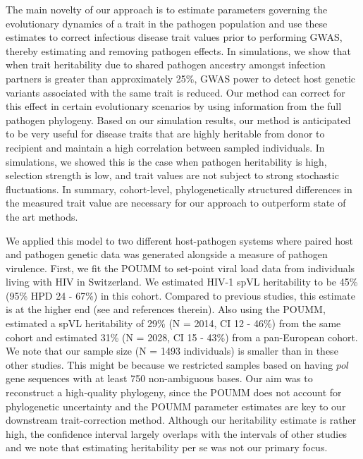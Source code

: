 \documentclass[11pt]{article}
\begin{document}
\begin{linenumbers}
The main novelty of our approach is to estimate parameters governing the evolutionary dynamics of a trait in the pathogen population and use these estimates to correct infectious disease trait values prior to performing GWAS, thereby estimating and removing pathogen effects. In simulations, we show that when trait heritability due to shared pathogen ancestry amongst infection partners is greater than approximately 25\%, GWAS power to detect host genetic variants associated with the same trait is reduced. Our method can correct for this effect in certain evolutionary scenarios by using information from the full pathogen phylogeny. Based on our simulation results, our method is anticipated to be very useful for disease traits that are highly heritable from donor to recipient and  maintain a high correlation between sampled individuals. In simulations, we showed this is the case when pathogen heritability is high, selection strength is low, and trait values are not subject to strong stochastic fluctuations. In summary, cohort-level, phylogenetically structured differences in the measured trait value are necessary for our approach to outperform state of the art methods. 

We applied this model to two different host-pathogen systems where paired host and pathogen genetic data was generated alongside a measure of pathogen virulence. First, we fit the POUMM to set-point viral load data from individuals living with HIV in Switzerland. We estimated HIV-1 spVL heritability to be 45\% (95\% HPD 24 - 67\%) in this cohort. Compared to previous studies, this estimate is at the higher end (see \citet{Mitov2018} and references therein). Also using the POUMM, \citet{Bertels2018} estimated a spVL heritability of 29\% (N = 2014, CI 12 - 46\%) from the same cohort and \citet{Blanquart2017} estimated 31\% (N = 2028, CI 15 - 43\%) from a pan-European cohort. We note that our sample size (N = 1493 individuals) is smaller than in these other studies. This might be because we restricted samples based on having $pol$ gene sequences with at least 750 non-ambiguous bases. Our aim was to reconstruct a high-quality phylogeny, since the POUMM does not account for phylogenetic uncertainty and the POUMM parameter estimates are key to our downstream trait-correction method. Although our heritability estimate is rather high, the confidence interval largely overlaps with the intervals  of other studies and we note that estimating heritability per se was not our primary focus.


\end{linenumbers}
\end{document}
